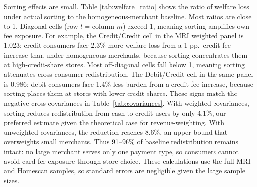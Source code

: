 \documentclass[main.tex]{subfiles}
\begin{document}
Sorting effects are small.
Table \ref{tab:welfare_ratio} shows the ratio of welfare loss under actual sorting to the homogeneous-merchant baseline. Most ratios are close to 1.
Diagonal cells (row $l$ = column $m$) exceed 1, meaning sorting amplifies own-fee exposure.
For example, the Credit/Credit cell in the MRI weighted panel is 1.023: credit consumers face 2.3\% more welfare loss from a 1 pp.\ credit fee increase than under homogeneous merchants, because sorting concentrates them at high-credit-share stores.
Most off-diagonal cells fall below 1, meaning sorting attenuates cross-consumer redistribution.
The Debit/Credit cell in the same panel is 0.986: debit consumers face 1.4\% less burden from a credit fee increase, because sorting places them at stores with lower credit shares.
These signs match the negative cross-covariances in Table~\ref{tab:covariances}.
With weighted covariances, sorting reduces redistribution from cash to credit users by only 4.1\%, our preferred estimate given the theoretical case for revenue-weighting.
With unweighted covariances, the reduction reaches 8.6\%, an upper bound that overweights small merchants.
Thus 91--96\% of baseline redistribution remains intact: no large merchant serves only one payment type, so consumers cannot avoid card fee exposure through store choice.
These calculations use the full MRI and Homescan samples, so standard errors are negligible given the large sample sizes.

\begin{table}[ht!]
\caption{Percentage of welfare lost from fee increases}
\label{tab:sorting-welfare}
\centering
    \begin{minipage}{0.5\textwidth}
    \centering
    \vspace{2pt}
    
    \end{minipage}\hfill
    \begin{minipage}{0.5\textwidth}
    \centering
    \vspace{2pt}
    
    \end{minipage}
\end{table}
\end{document}
